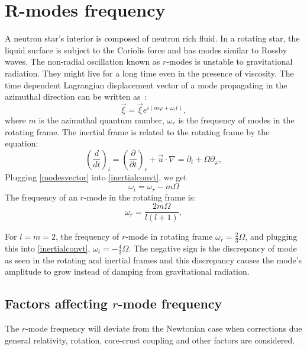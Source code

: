 \documentclass{ttuthes2007}
\begin{document}
\section{R-modes frequency}
A neutron star's interior is composed of neutron rich fluid. In a rotating star,
the liquid surface is subject to the Coriolis force and has modes similar to
Rossby waves. The non-radial oscillation known as $r$-modes is unstable to
gravitational radiation. They might live for a long time even in the presence of
viscosity. The time dependent Lagrangian displacement vector of a mode
propagating in the azimuthal direction can be written as~\cite{ANDERSSON_2001}:
\begin{equation}\label{modesvector}
\vec{\xi}= \vec{\xi} e^{i(m\varphi+\omega_r t)},
\end{equation}
where $m$ is the azimuthal quantum number, $\omega_r$ is the frequency of modes in
the rotating frame.
The inertial frame is related to the rotating frame by the equation:
\begin{equation}\label{inertialconvt}
\left(\frac{d}{dt}\right)_i=\left(\frac{\partial}{\partial
t}\right)_r+\vec{u}\cdot\nabla=\partial_t+ \Omega
\partial_\varphi,
\end{equation}
Plugging \ref{modesvector} into \ref{inertialconvt}, we get
\begin{equation}
\omega_i=\omega_r - m\Omega
\end{equation}
The frequency of an $r$-mode in the rotating frame is:
\begin{equation}\label{rotatingframe}
\omega_r = \frac{2m\Omega}{l(l+1)},
\end{equation}

For $l=m=2$, the frequency of $r$-mode in rotating frame $\omega_r=\frac{2}{3}\Omega$, and plugging this into \ref{inertialconvt},
$\omega_i = -\frac{4}{3}\Omega$.
The negative sign is the discrepancy of mode as seen in the rotating and
inertial frames and this discrepancy causes the mode's amplitude to grow instead
of damping from gravitational radiation. 

\subsection{Factors affecting $r$-mode frequency}
The $r$-mode frequency will deviate from the Newtonian case when corrections due
general relativity, rotation, core-crust coupling and other factors are considered. 
\end{document}
